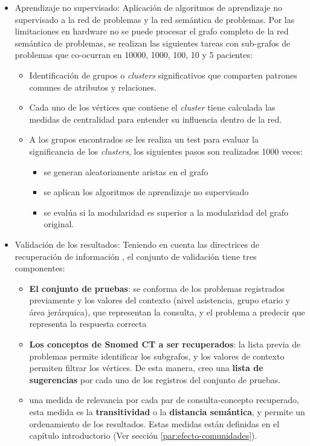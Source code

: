 \begin{itemize}
\item Aprendizaje no supervisado: Aplicación de algoritmos de aprendizaje no supervisado a la red de problemas y la red semántica de problemas. Por las limitaciones en hardware no se puede procesar el grafo completo de la red semántica de problemas, se realizan las siguientes tareas con sub-grafos de problemas que co-ocurran en \num{10000}, \num{1000}, \num{100}, \num{10} y \num{5} pacientes:
\begin{itemize}
    \item Identificación de grupos o \textit{clusters} significativos que comparten patrones comunes de atributos y relaciones. 
    \item Cada uno de los vértices que contiene el \textit{cluster} tiene calculada las medidas de centralidad para entender su influencia dentro de la red. 
    \item A los grupos encontrados se les realiza un test para evaluar la significancia de los \textit{clusters}, los siguientes pasos son realizados 1000 veces:
    \begin{itemize}
\item  se generan aleatoriamente aristas en el grafo
\item  se aplican los algoritmos de aprendizaje no supervisado
\item  se evalúa si la modularidad es superior a la modularidad del grafo original.
\end{itemize}
\end{itemize}

\item Validación de los resultados: 
\label{par:evaluacion-resultados}
Teniendo en cuenta las directrices de recuperación de información \cite{Manning2008IntroductionRetrieval,Hersh1994OHSUMED:Research}, el conjunto de validación tiene tres componentes: 

\begin{itemize}
\item \textbf{El conjunto de pruebas}: se conforma de los problemas registrados previamente y los valores del contexto (nivel asistencia, grupo etario y área jerárquica), que representan la consulta, y el problema a predecir que representa la respuesta correcta
\item \textbf{Los conceptos de Snomed CT a ser recuperados}: la lista previa de problemas permite identificar los subgrafos, y los valores de contexto permiten filtrar los vértices. De esta manera, creo una \textbf{lista de sugerencias} por cada uno de los registros del conjunto de pruebas.
\item una medida de relevancia por cada par de consulta-concepto recuperado, esta medida es la \textbf{transitividad} o la \textbf{distancia semántica}, y permite un ordenamiento de los resultados. Estas medidas están definidas en el capítulo introductorio (Ver sección \ref{par:efecto-comunidades}).
\end{itemize}


\end{itemize}
